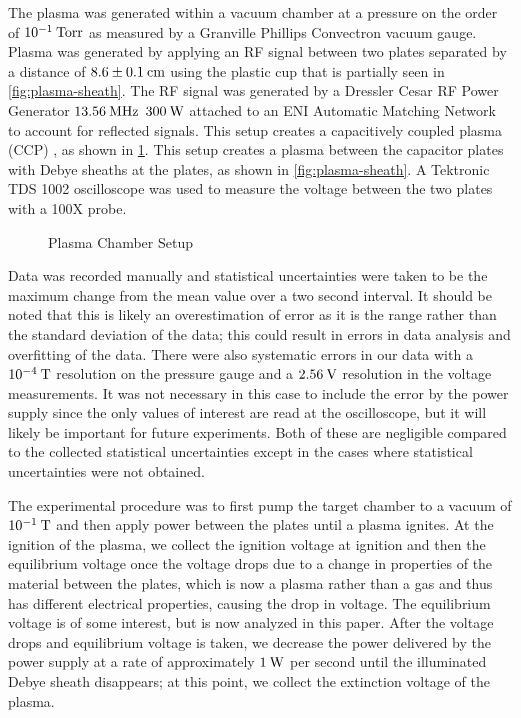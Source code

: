 \documentclass[reprint]{revtex4-1}
\begin{document}
The plasma was generated within a vacuum chamber at a pressure on the order of $10^{-1}\:\rm{Torr}$ as measured by a Granville Phillips Convectron vacuum gauge. Plasma was generated by applying an RF signal between two plates separated by a distance of $8.6 \pm 0.1\:\rm{cm}$ using the plastic cup that is partially seen in \cref{fig:plasma-sheath}. The RF signal was generated by a Dressler Cesar RF Power Generator $13.56\:\rm{MHz}$ $300\:\rm{W}$ attached to an ENI Automatic Matching Network to account for reflected signals. This setup creates a capacitively coupled plasma (CCP) \cite{physics-radio-frequency}, as shown in \cref{fig:plasma-chamber-diagram}. This setup creates a plasma between the capacitor plates with Debye sheaths at the plates, as shown in \cref{fig:plasma-sheath}.  A Tektronic TDS 1002 oscilloscope was used to measure the voltage between the two plates with a 100X probe.

\begin{figure}

\caption{Plasma Chamber Setup}
\label{fig:plasma-chamber-diagram}
\end{figure}

Data was recorded manually and statistical uncertainties were taken to be the maximum change from the mean value over a two second interval. It should be noted that this is likely an overestimation of error as it is the range rather than the standard deviation of the data; this could result in errors in data analysis and overfitting of the data. There were also systematic errors in our data with a $10^{-4}\:\rm{T}$ resolution on the pressure gauge and a $2.56\:\rm{V}$ resolution in the voltage measurements. It was not necessary in this case to include the error by the power supply since the only values of interest are read at the oscilloscope, but it will likely be important for future experiments. Both of these are negligible compared to the collected statistical uncertainties except in the cases where statistical uncertainties were not obtained.

The experimental procedure was to first pump the target chamber to a vacuum of $10^{-1}\:\rm{T}$ and then apply power between the plates until a plasma ignites. At the ignition of the plasma, we collect the ignition voltage at ignition and then the equilibrium voltage once the voltage drops due to a change in properties of the material between the plates, which is now a plasma rather than a gas and thus has different electrical properties, causing the drop in voltage. The equilibrium voltage is of some interest, but is now analyzed in this paper. After the voltage drops and equilibrium voltage is taken, we decrease the power delivered by the power supply at a rate of approximately $1\:\rm{W}$ per second until the illuminated Debye sheath disappears; at this point, we collect the extinction voltage of the plasma.
\end{document}
